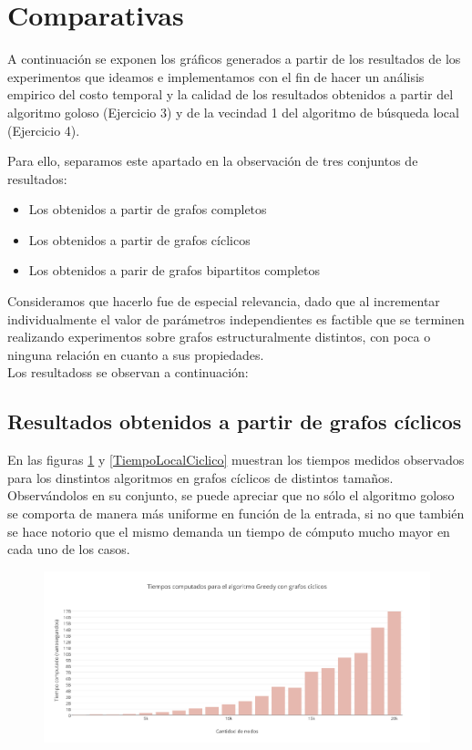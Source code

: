 \section{Comparativas}

A continuación se exponen los gráficos generados a partir de los resultados de los experimentos que ideamos e implementamos con el fin de hacer un análisis empirico del costo temporal y la calidad de los resultados obtenidos a partir del algoritmo goloso (Ejercicio 3) y de la vecindad 1 del algoritmo de búsqueda local (Ejercicio 4). 

Para ello, separamos este apartado en la observación de tres conjuntos de resultados:

\begin{itemize}
\item {Los obtenidos a partir de grafos completos}
\item {Los obtenidos a partir de grafos cíclicos}
\item {Los obtenidos a parir de grafos bipartitos completos}
\end{itemize}

Consideramos que hacerlo fue de especial relevancia, dado que al incrementar individualmente el valor de parámetros independientes es factible que se terminen realizando experimentos sobre grafos estructuralmente distintos, con poca o ninguna relación en cuanto a sus propiedades.\\
Los resultadoss se observan a continuación:\\


\subsection {Resultados obtenidos a partir de grafos cíclicos} 

En las figuras \ref{TiempoGreedyCiclico} y \ref{TiempoLocalCiclico} muestran los tiempos medidos observados para los dinstintos algoritmos en grafos cíclicos de distintos tamaños. \\
Observándolos en su conjunto, se puede apreciar que no sólo el algoritmo goloso se comporta de manera más uniforme en función de la entrada, si no que también se hace notorio que el mismo demanda un tiempo de cómputo mucho mayor en cada uno de los casos.\\  
 
\begin{figure}[H]
    \begin{center}
  	\includegraphics[width=18cm]{imagenes/Ej5/TiempoGreedyCiclico.png}
 	\label{TiempoGreedyCiclico}
    \end{center}
  \end{figure}

